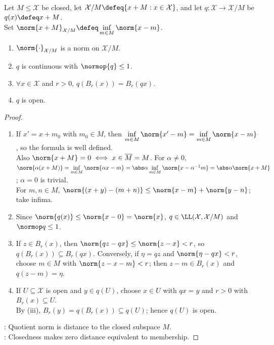 \begin{proposition} \label{prop:quotient-norm-and-map} \\
Let $M\leq\mathcal X$ be closed, let $\mathcal X/M\defeq\{x+M:x\in\mathcal X\}$, and let $q:\mathcal X\to\mathcal X/M$ be $q(x)\defeq x+M$.\\
Set $\norm{x+M}_{\mathcal X/M}\defeq\inf\limits_{m\in M}\norm{x-m}$.
\begin{enumerate}[label=(\roman*)]
\setlength{\itemsep}{0pt}
\item $\norm{\cdot}_{\mathcal{X}/M}$ is a norm on $\mathcal{X}/M$.
\item $q$ is continuous with $\normop{q}\leq1$.
\item $\forall x\in\mathcal{X}$ and $r>0$, $q(B_r(x))=B_r(qx)$.
\item $q$ is open.
\end{enumerate}
\begin{proof}
\begin{enumerate}[label=(\roman*)]
\setlength{\itemsep}{0pt}
\item If $x'=x+m_0$ with $m_0\in M$, then $\inf\limits_{m\in M}\norm{x'-m}=\inf\limits_{m\in M}\norm{x-m}$, so the formula is well defined.\\
Also $\norm{x+M}=0\iff x\in\overline M=M$. For $\alpha\ne0$,\\
$\norm{\alpha(x+M)}=\inf\limits_{m\in M}\norm{\alpha x-m}=\abs\alpha\inf\limits_{m\in M}\norm{x-\alpha^{-1}m}=\abs\alpha\norm{x+M}$; $\alpha=0$ is trivial.\\
For $m,n\in M$, $\norm{(x+y)-(m+n)}\leq\norm{x-m}+\norm{y-n}$; take infima.
\item Since $\norm{q(x)}\leq\norm{x-0}=\norm{x}$, $q\in\LL(\mathcal X,\mathcal X/M)$ and $\normop q\leq1$.
\item If $z\in B_r(x)$, then $\norm{qz-qx}\leq\norm{z-x}<r$, so $q(B_r(x))\subseteq B_r(qx)$. Conversely, if $\eta=qz$ and $\norm{\eta-qx}<r$, choose $m\in M$ with $\norm{z-x-m}<r$; then $z-m\in B_r(x)$ and $q(z-m)=\eta$.
\item If $U\subseteq\mathcal X$ is open and $y\in q(U)$, choose $x\in U$ with $qx=y$ and $r>0$ with $B_r(x)\subseteq U$.\\
By (iii), $B_r(y)=q(B_r(x))\subseteq q(U)$; hence $q(U)$ is open.
\end{enumerate}
: Quotient norm is distance to the closed subspace $M$.\\
: Closedness makes zero distance equivalent to membership.
\end{proof}
\end{proposition}

